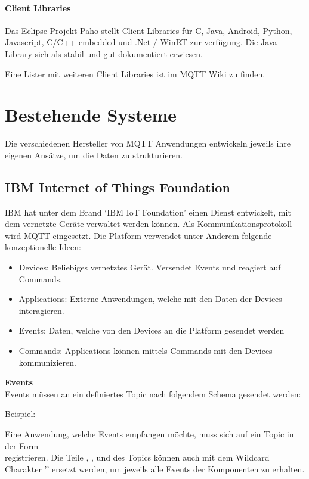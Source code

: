 \paragraph{Client Libraries}

Das Eclipse Projekt Paho \cite{paho} stellt Client Libraries für C, Java, Android, Python,
 Javascript, C/C++ embedded und .Net / WinRT zur verfügung. Die Java Library sich als stabil und gut dokumentiert erwiesen.

Eine Lister mit weiteren Client Libraries ist im MQTT Wiki \cite{clientLibs} zu finden.



\section{Bestehende Systeme}
Die verschiedenen Hersteller von MQTT Anwendungen entwickeln jeweils ihre eigenen Ansätze, um die Daten zu strukturieren. 


\subsection{IBM Internet of Things Foundation}

IBM hat unter dem Brand `IBM IoT Foundation' \cite{ibmIotF:home} einen Dienst entwickelt, mit dem vernetzte Geräte verwaltet werden können. Als Kommunikationsprotokoll wird MQTT eingesetzt. Die Platform verwendet unter Anderem folgende konzeptionelle Ideen:
\begin{itemize}
	\item Devices: Beliebiges vernetztes Gerät. Versendet Events und reagiert auf Commands.
	\item Applications: Externe Anwendungen, welche mit den Daten der Devices interagieren.
	\item Events: Daten, welche von den Devices an die Platform gesendet werden
	\item Commands: Applications können mittels Commands mit den Devices kommunizieren.
\end{itemize}

\textbf{Events} \\
Events müssen an ein definiertes Topic nach folgendem Schema gesendet werden: \\

Beispiel: 

Eine Anwendung, welche Events empfangen möchte, muss sich auf ein Topic in der Form \\
 registrieren.
Die Teile , ,  und  des Topics können auch mit dem Wildcard Charakter '\code{+}' ersetzt werden, um jeweils alle Events der Komponenten zu erhalten. 

